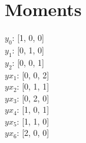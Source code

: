 \documentclass{article}
\begin{document}
\section*{Moments}

$y_{0}$: {[1, 0, 0]}\\
$y_{1}$: {[0, 1, 0]}\\
$y_{2}$: {[0, 0, 1]}\\
$yx_{1}$: {[0, 0, 2]}\\
$yx_{2}$: {[0, 1, 1]}\\
$yx_{3}$: {[0, 2, 0]}\\
$yx_{4}$: {[1, 0, 1]}\\
$yx_{5}$: {[1, 1, 0]}\\
$yx_{6}$: {[2, 0, 0]}\\
\end{document}
